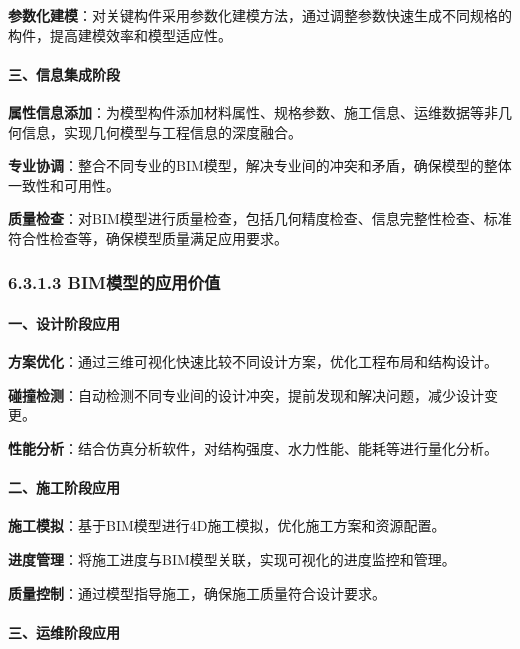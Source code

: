 \textbf{参数化建模}：对关键构件采用参数化建模方法，通过调整参数快速生成不同规格的构件，提高建模效率和模型适应性。

\paragraph{三、信息集成阶段}\label{ux4e09ux4fe1ux606fux96c6ux6210ux9636ux6bb5}

\textbf{属性信息添加}：为模型构件添加材料属性、规格参数、施工信息、运维数据等非几何信息，实现几何模型与工程信息的深度融合。

\textbf{专业协调}：整合不同专业的BIM模型，解决专业间的冲突和矛盾，确保模型的整体一致性和可用性。

\textbf{质量检查}：对BIM模型进行质量检查，包括几何精度检查、信息完整性检查、标准符合性检查等，确保模型质量满足应用要求。

\subsubsection{6.3.1.3
BIM模型的应用价值}\label{bimux6a21ux578bux7684ux5e94ux7528ux4ef7ux503c}

\paragraph{一、设计阶段应用}\label{ux4e00ux8bbeux8ba1ux9636ux6bb5ux5e94ux7528}

\textbf{方案优化}：通过三维可视化快速比较不同设计方案，优化工程布局和结构设计。

\textbf{碰撞检测}：自动检测不同专业间的设计冲突，提前发现和解决问题，减少设计变更。

\textbf{性能分析}：结合仿真分析软件，对结构强度、水力性能、能耗等进行量化分析。

\paragraph{二、施工阶段应用}\label{ux4e8cux65bdux5de5ux9636ux6bb5ux5e94ux7528}

\textbf{施工模拟}：基于BIM模型进行4D施工模拟，优化施工方案和资源配置。

\textbf{进度管理}：将施工进度与BIM模型关联，实现可视化的进度监控和管理。

\textbf{质量控制}：通过模型指导施工，确保施工质量符合设计要求。

\paragraph{三、运维阶段应用}\label{ux4e09ux8fd0ux7ef4ux9636ux6bb5ux5e94ux7528}

